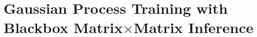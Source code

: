 \chapter{Gaussian Process Training with Blackbox Matrix$\times$Matrix Inference}
\label{chapter:bbmm}








%

%

%

%

